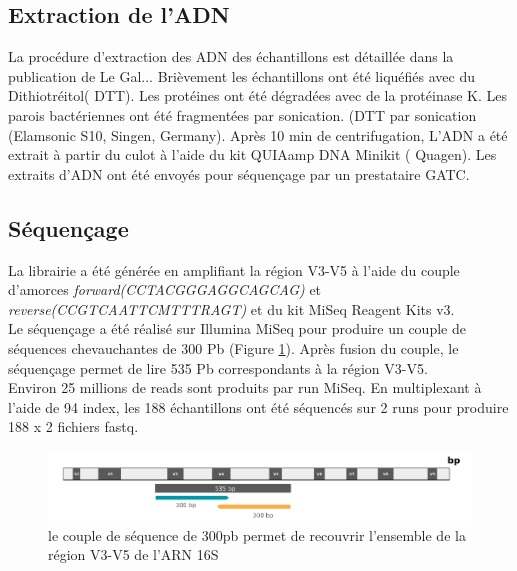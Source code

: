 \documentclass[12pt,a4paper]{article}
\begin{document}
\subsection{Extraction de l’ADN}

La procédure d'extraction des ADN des échantillons est détaillée dans la publication de Le Gal... Brièvement les échantillons ont été liquéfiés avec du Dithiotréitol( DTT). Les protéines ont été dégradées avec de la protéinase K.
Les parois bactériennes ont été fragmentées par sonication. (DTT par sonication (Elamsonic S10, Singen, Germany). Après 10 min de centrifugation, L’ADN a été extrait à partir du culot à l'aide du kit QUIAamp DNA Minikit ( Quagen).
Les extraits d’ADN ont été envoyés pour séquençage par un prestataire GATC.

\subsection{Séquençage}
La librairie a été générée en amplifiant la région V3-V5 à l’aide du couple d’amorces  \textit{forward(CCTACGGGAGGCAGCAG)} et \textit{reverse(CCGTCAATTCMTTTRAGT)} et du kit MiSeq Reagent Kits v3. \\
Le séquençage a été réalisé sur Illumina MiSeq pour produire un couple de séquences chevauchantes de 300 Pb (Figure \ref{illumina}). Après fusion du couple, le séquençage permet de lire  535 Pb correspondants à la région V3-V5.\\
Environ 25 millions de reads sont produits par run MiSeq. En multiplexant à l’aide de 94 index, les 188 échantillons ont été séquencés sur 2 runs pour produire 188 x 2 fichiers fastq.

\begin{figure}[ht]
\begin{center}
\includegraphics[scale=0.6]{img/illumina.png}\hfill
\end{center}
\caption{le couple de séquence de 300pb permet de recouvrir l'ensemble de la région V3-V5 de l'ARN 16S}
\label{illumina}
\end{figure}
\end{document}
